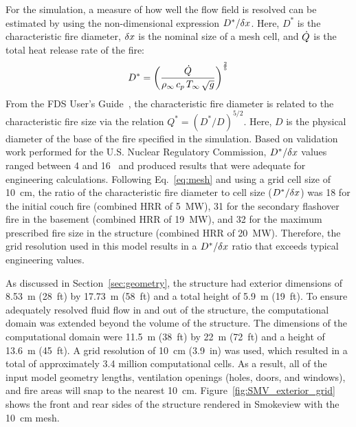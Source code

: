 \documentclass[12pt,oneside]{book}
\begin{document}
For the simulation, a measure of how well the flow field is resolved can be estimated by using the non-dimensional expression $D^*/\delta x$. Here, $D^*$ is the characteristic fire diameter, $\delta x$ is the nominal size of a mesh cell, and $\dot{Q}$ is the total heat release rate of the fire:
\begin{equation}
D^* = \left(
     \frac{\dot{Q}}{\rho_\infty \, c_p \, T_\infty \, \sqrt{g}}
     \right)^\frac{2}{5} 
\label{eq:mesh}
\end{equation}
From the FDS User's Guide~\cite{FDS_Users_Guide}, the characteristic fire diameter is related to the characteristic fire size via the relation $Q^* = (D^*/D)^{5/2}$. Here, $D$ is the physical diameter of the base of the fire specified in the simulation. Based on validation work performed for the U.S. Nuclear Regulatory Commission, $D^*/\delta x$ values ranged between 4 and 16~\cite{NUREG_1824} and produced results that were adequate for engineering calculations. Following Eq.~\ref{eq:mesh} and using a grid cell size of 10~cm, the ratio of the characteristic fire diameter to cell size ($D^*/\delta x$) was 18 for the initial couch fire (combined HRR of 5~MW), 31 for the secondary flashover fire in the basement (combined HRR of 19~MW), and 32 for the maximum prescribed fire size in the structure (combined HRR of 20~MW). Therefore, the grid resolution used in this model results in a $D^*/\delta x$ ratio that exceeds typical engineering values.

As discussed in Section~\ref{sec:geometry}, the structure had exterior dimensions of 8.53~m (28~ft) by 17.73~m (58~ft) and a total height of 5.9~m (19~ft). To ensure adequately resolved fluid flow in and out of the structure, the computational domain was extended beyond the volume of the structure. The dimensions of the computational domain were 11.5~m (38~ft) by 22~m (72~ft) and a height of 13.6~m (45~ft). A grid resolution of 10~cm (3.9~in) was used, which resulted in a total of approximately 3.4 million computational cells. As a result, all of the input model geometry lengths, ventilation openings (holes, doors, and windows), and fire areas will snap to the nearest 10~cm. Figure~\ref{fig:SMV_exterior_grid} shows the front and rear sides of the structure rendered in Smokeview with the 10~cm mesh.
\end{document}
